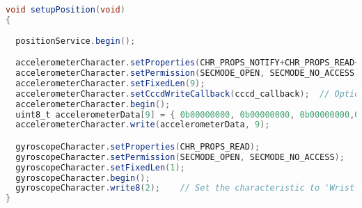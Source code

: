 \begin{lstlisting}[float,language=Java,caption=Tập lệnh đọc dữ liệu từ BLE, label=flutter_get_data,captionpos=b]
void setupPosition(void)
{
 
  positionService.begin();

  accelerometerCharacter.setProperties(CHR_PROPS_NOTIFY+CHR_PROPS_READ+CHR_PROPS_WRITE );
  accelerometerCharacter.setPermission(SECMODE_OPEN, SECMODE_NO_ACCESS);
  accelerometerCharacter.setFixedLen(9);
  accelerometerCharacter.setCccdWriteCallback(cccd_callback);  // Optionally capture CCCD updates
  accelerometerCharacter.begin();
  uint8_t accelerometerData[9] = { 0b00000000, 0b00000000, 0b00000000,0b00000000,0b00000000,0b00000000,0b00000000,0b00000000,0b00000000}; // Set the characteristic to use 8-bit values, with the sensor connected and detected
  accelerometerCharacter.write(accelerometerData, 9);

  gyroscopeCharacter.setProperties(CHR_PROPS_READ);
  gyroscopeCharacter.setPermission(SECMODE_OPEN, SECMODE_NO_ACCESS);
  gyroscopeCharacter.setFixedLen(1);
  gyroscopeCharacter.begin();
  gyroscopeCharacter.write8(2);    // Set the characteristic to 'Wrist' (2)
}

\end{lstlisting}


